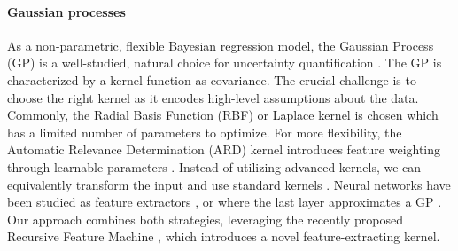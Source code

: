 \paragraph{Gaussian processes}
As a non-parametric, flexible Bayesian regression model, the Gaussian Process (GP) is a well-studied, natural choice for uncertainty quantification \citep{rasmussen2006gaussian}. The GP is characterized by a kernel function as covariance. The crucial challenge is to choose the right kernel as it encodes high-level assumptions about the data. Commonly, the Radial Basis Function (RBF) or Laplace kernel is chosen which has a limited number of parameters to optimize. For more flexibility, the Automatic Relevance Determination (ARD) kernel introduces feature weighting through learnable parameters \citep{mackay1992bayesian,neal1996bayesian}. Instead of utilizing advanced kernels, we can equivalently transform the input and use standard kernels \citep{mackay1998introduction}. Neural networks have been studied as feature extractors \citep{calandra2016manifold,wilson2016deep}, or where the last layer approximates a GP \citep{huang2015scalable,liu2020simple}. Our approach combines both strategies, leveraging the recently proposed Recursive Feature Machine \citep{radhakrishnan2022feature}, which introduces a novel feature-extracting kernel.







